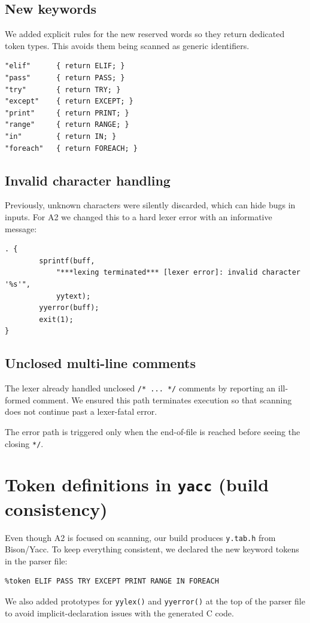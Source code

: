 \documentclass[11pt]{article}
\begin{document}
\subsection{New keywords}
We added explicit rules for the new reserved words so they return dedicated token types.
This avoids them being scanned as generic identifiers.
\begin{lstlisting}
"elif"      { return ELIF; }
"pass"      { return PASS; }
"try"       { return TRY; }
"except"    { return EXCEPT; }
"print"     { return PRINT; }
"range"     { return RANGE; }
"in"        { return IN; }
"foreach"   { return FOREACH; }
\end{lstlisting}

\subsection{Invalid character handling}
Previously, unknown characters were silently discarded, which can hide bugs in inputs.
For A2 we changed this to a hard lexer error with an informative message:
\begin{lstlisting}
. {
		sprintf(buff,
			"***lexing terminated*** [lexer error]: invalid character '%s'",
			yytext);
		yyerror(buff);
		exit(1);
}
\end{lstlisting}

\subsection{Unclosed multi-line comments}
The lexer already handled unclosed \texttt{/* ... */} comments by reporting an ill-formed comment.
We ensured this path terminates execution so that scanning does not continue past a lexer-fatal error.

The error path is triggered only when the end-of-file is reached before seeing the closing \texttt{*/}.

\section{Token definitions in \texttt{yacc} (build consistency)}
Even though A2 is focused on scanning, our build produces \texttt{y.tab.h} from Bison/Yacc.
To keep everything consistent, we declared the new keyword tokens in the parser file:
\begin{lstlisting}
%token ELIF PASS TRY EXCEPT PRINT RANGE IN FOREACH
\end{lstlisting}

We also added prototypes for \texttt{yylex()} and \texttt{yyerror()} at the top of the parser file to avoid implicit-declaration issues with the generated C code.
\end{document}
